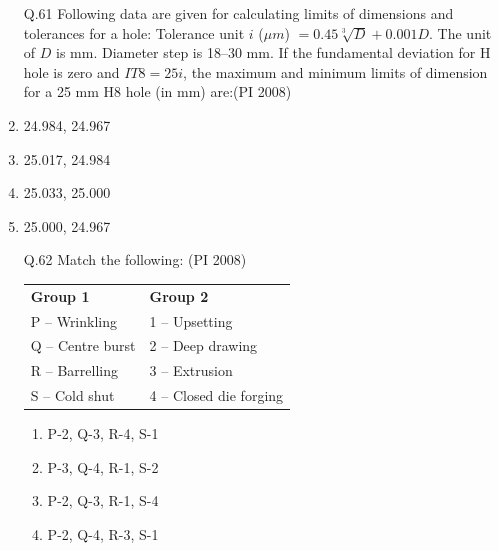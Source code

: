 \documentclass[journal,12pt,onecolumn]{IEEEtran}
\theoremstyle{remark}
\begin{document}
\begin{enumerate}
\begin{multicols}{4}
    \begin{enumerate}[label=(\Alph*)]
\item 6 degree 
(B) 10 degree 
(C) 11 degree
(D) 12 degree

\end{enumerate}
\end{multicols}
\vspace{1cm}
\item[\textnormal{Q.61}]
Following data are given for calculating limits of dimensions and tolerances for a hole:  
Tolerance unit $i$ ($\mu m$) $= 0.45\sqrt[3]{D} + 0.001D$.  
The unit of $D$ is mm. Diameter step is 18--30 mm.  
If the fundamental deviation for H hole is zero and $IT8 = 25i$, the maximum and minimum limits of dimension for a 25 mm H8 hole (in mm) are:\hfill{(PI 2008)}

\noindent
\item  24.984, 24.967 \\
\item  25.017, 24.984 \\
\item  25.033, 25.000 \\
\item 25.000, 24.967

\vspace{0.5cm}
\item[\textnormal{Q.62}] 
Match the following:  
\hfill{(PI 2008)}
\begin{tabular}{ll}
\textbf{Group 1} & \textbf{Group 2} \\
P -- Wrinkling & 1 -- Upsetting \\
Q -- Centre burst & 2 -- Deep drawing \\
R -- Barrelling & 3 -- Extrusion \\
S -- Cold shut & 4 -- Closed die forging \\
\end{tabular}

\begin{multicols}{4}
    \begin{enumerate}[label=(\Alph*)]
\item  P-2, Q-3, R-4, S-1 
\item  P-3, Q-4, R-1, S-2 
\item  P-2, Q-3, R-1, S-4 
\item  P-2, Q-4, R-3, S-1
\end{enumerate}
\end{multicols}
\vspace{1cm}


\end{enumerate}
\end{document}
